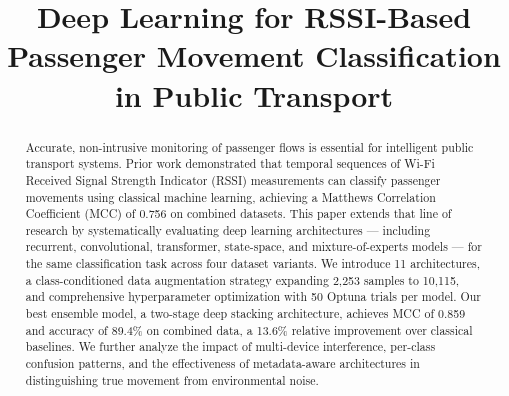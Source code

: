 \documentclass[conference]{IEEEtran}
\begin{document}
\title{Deep Learning for RSSI-Based Passenger Movement Classification in Public Transport}


\author{
\and
{}
\and
{}
\and
{}
\and
{}
}

\maketitle

\begin{abstract}
    Accurate, non-intrusive monitoring of passenger flows is essential for intelligent public transport systems. Prior work demonstrated that temporal sequences of Wi-Fi Received Signal Strength Indicator (RSSI) measurements can classify passenger movements using classical machine learning, achieving a Matthews Correlation Coefficient (MCC) of 0.756 on combined datasets. This paper extends that line of research by systematically evaluating deep learning architectures --- including recurrent, convolutional, transformer, state-space, and mixture-of-experts models --- for the same classification task across four dataset variants. We introduce 11 architectures, a class-conditioned data augmentation strategy expanding 2,253 samples to 10,115, and comprehensive hyperparameter optimization with 50 Optuna trials per model. Our best ensemble model, a two-stage deep stacking architecture, achieves MCC of 0.859 and accuracy of 89.4\% on combined data, a 13.6\% relative improvement over classical baselines. We further analyze the impact of multi-device interference, per-class confusion patterns, and the effectiveness of metadata-aware architectures in distinguishing true movement from environmental noise.
\end{abstract}
\end{document}
